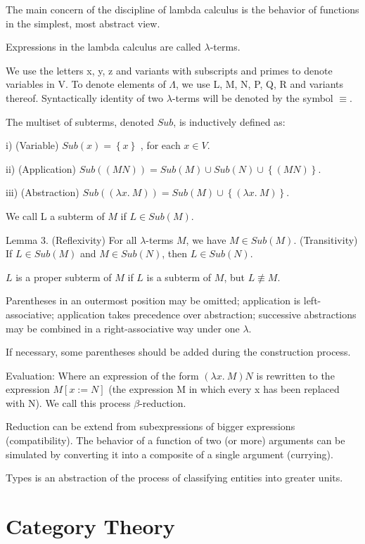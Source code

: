 {\color{red}

The main concern of the discipline of lambda calculus is the behavior of functions in the simplest, most abstract view.

Expressions in the lambda calculus are called $\lambda$-terms.

We use the letters x, y, z and variants with subscripts and primes to denote variables in V. To denote elements of $\Lambda$, we use L, M, N, P, Q, R
and variants thereof. Syntactically identity of two $\lambda$-terms will be denoted by the symbol $\equiv$.

\begin{definition}
The multiset of subterms, denoted $Sub$, is inductively defined as:

i) (Variable) $Sub\left(x\right)=\left\{ x\right\}$ , for each $x\in V$.

ii) (Application) $Sub\left(\left(MN\right)\right)=Sub\left(M\right)\cup Sub\left(N\right)\cup\left\{ \left(MN\right)\right\}$.

iii) (Abstraction) $Sub\left(\left(\lambda x.\:M\right)\right)=Sub\left(M\right)\cup\left\{ \left(\lambda x.\:M\right)\right\}$.
\end{definition}

We call L a subterm of $M$ if $L\in Sub\left(M\right)$.

Lemma 3. (Reflexivity) For all $\lambda$-terms $M$, we have $M\in Sub\left(M\right)$.
(Transitivity) If $L\in Sub\left(M\right)$ and $M\in Sub\left(N\right)$, then $L\in Sub\left(N\right)$.

\begin{definition}
$L$ is a proper subterm of $M$ if $L$ is a subterm of $M$, but $L\not\equiv M$.
\end{definition}

Parentheses in an outermost position may be omitted; application is left-associative; application takes precedence over abstraction;
successive abstractions may be combined in a right-associative way under one $\lambda$.

}


{\color{red}

If necessary, some parentheses should be added during the construction process.

Evaluation: Where an expression of the form $\left(\lambda x.\:M\right)N$ is rewritten to the expression $M\left[x:=N\right]$ (the expression M in
which every x has been replaced with N). We call this process $\beta$-reduction.

Reduction can be extend from subexpressions of bigger expressions (compatibility). The behavior of a function of two (or more) arguments can
be simulated by converting it into a composite of a single argument (currying).

}

{\color{red}

Types is an abstraction of the process of classifying entities into greater units.

}


%
%
\section{Category Theory}


